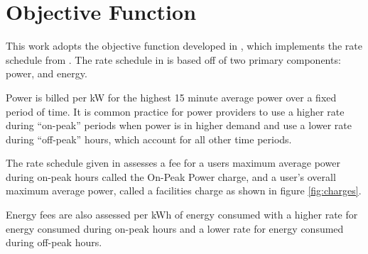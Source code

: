\section{Objective Function\label{sec:objective}}
This work adopts the objective function developed in \cite{mortensen_comprehensive_2021}, which implements the rate schedule from \cite{rocky_mountain_power_rocky_2021}. The rate schedule in \cite{rocky_mountain_power_rocky_2021} is based off of two primary components: power, and energy.  
\par Power is billed per kW for the highest 15 minute average power over a fixed period of time. It is common practice for power providers to use a higher rate during ``on-peak'' periods when power is in higher demand and use a lower rate during ``off-peak'' hours, which account for all other time periods. 
\par The rate schedule given in \cite{rocky_mountain_power_rocky_2021} assesses a fee for a users maximum average power during on-peak hours called the On-Peak Power charge, and a user's overall maximum average power, called a facilities charge as shown in figure \ref{fig:charges}. 
\par Energy fees are also assessed per kWh of energy consumed with a higher rate for energy consumed during on-peak hours and a lower rate for energy consumed during off-peak hours.

